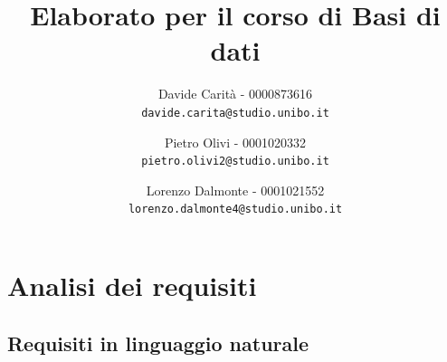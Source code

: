 \documentclass[a4paper,12pt]{report}
\begin{document}
    
	\title{Elaborato per il corso di Basi di dati}
	\author{
      Davide Carità - 0000873616\\
      \texttt{davide.carita@studio.unibo.it}
      \and
      Pietro Olivi - 0001020332\\
      \texttt{pietro.olivi2@studio.unibo.it}
      \and
      Lorenzo Dalmonte - 0001021552\\
      \texttt{lorenzo.dalmonte4@studio.unibo.it}
    }
	\date{}
	
    \maketitle
	\tableofcontents*
	\newpage

	\chapter{Analisi dei requisiti}

        \section{Requisiti in linguaggio naturale}
    	
\end{document}
